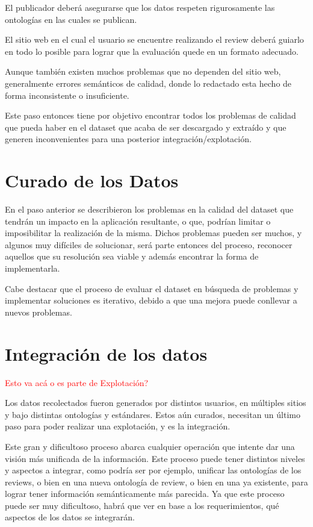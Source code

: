 El publicador deberá asegurarse que los datos respeten rigurosamente las ontologías en las cuales se publican.

El sitio web en el cual el usuario se encuentre realizando el review deberá guiarlo en todo lo posible para lograr que la evaluación
quede en un formato adecuado.


Aunque también existen muchos problemas que no dependen del sitio web, generalmente errores semánticos de calidad, donde lo 
redactado esta hecho de forma inconsistente o insuficiente.


Este paso entonces tiene por objetivo encontrar todos los problemas de calidad que pueda haber en el dataset que acaba de 
ser descargado y extraído y que generen inconvenientes para una posterior integración/explotación.

%
\section{Curado de los Datos}

En el paso anterior se describieron los problemas en la calidad del dataset que tendrán un impacto en la aplicación resultante, 
o que, podrían limitar o imposibilitar la realización de la misma. Dichos problemas pueden ser muchos, y algunos muy difíciles
de solucionar, será parte entonces del proceso, reconocer aquellos que su resolución sea viable y además encontrar la forma de 
implementarla.

Cabe destacar que el proceso de evaluar el dataset en búsqueda de problemas y implementar soluciones es iterativo, debido a que 
una mejora puede conllevar a nuevos problemas.

%

\section{Integración de los datos}
\begin{framed}
\textcolor{red}{Esto va acá o es parte de Explotación?}
\end{framed}


Los datos recolectados fueron generados por distintos usuarios, en múltiples sitios y bajo distintas ontologías y estándares.
Estos aún curados, necesitan un último paso para poder realizar una explotación, y es la integración.

Este gran y dificultoso proceso abarca cualquier operación que intente dar una visión más unificada de la información. Este
proceso puede tener distintos niveles y aspectos a integrar, como podría ser por ejemplo, unificar las ontologías de los reviews, o bien
en una nueva ontología de review, o bien en una ya existente, para lograr tener información semánticamente más parecida. Ya 
que este proceso puede ser muy dificultoso, habrá que ver en base a los requerimientos, qué aspectos de los datos se integrarán.

